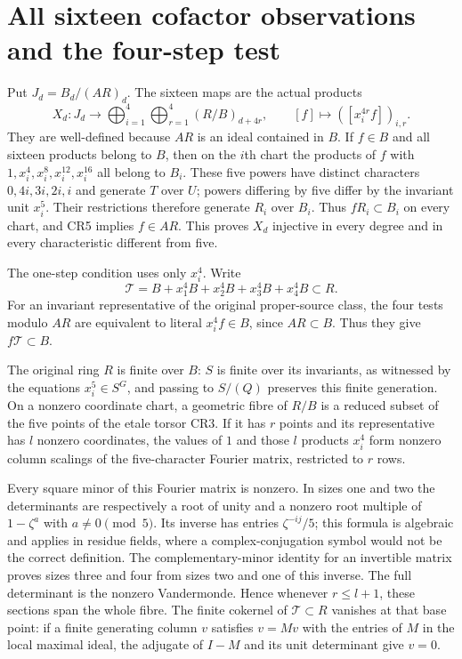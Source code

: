 \section{All sixteen cofactor observations and the four-step test}
Put $J_d=B_d/(AR)_d$.  The sixteen maps are the actual products
\[
 X_d:J_d\longrightarrow\bigoplus_{i=1}^4\bigoplus_{r=1}^4
                          (R/B)_{d+4r},
 \qquad [f]\longmapsto([x_i^{4r}f])_{i,r}.                       \tag{CR6}
\]
They are well-defined because $AR$ is an ideal contained in $B$.
If $f\in B$ and all sixteen products belong to $B$, then on the
$i$th chart the products of $f$ with
$1,x_i^4,x_i^8,x_i^{12},x_i^{16}$ all belong to $B_i$.
These five powers have distinct characters $0,4i,3i,2i,i$ and
generate $T$ over $U$; powers differing by five differ by the
invariant unit $x_i^5$.  Their restrictions therefore generate
$R_i$ over $B_i$.  Thus $fR_i\subset B_i$ on every chart, and
CR5 implies $f\in AR$.  This proves $X_d$ injective in every
degree and in every characteristic different from five.

The one-step condition uses only $x_i^4$.  Write
\[
 \mathcal T=B+x_1^4B+x_2^4B+x_3^4B+x_4^4B\subset R.            \tag{CR7}
\]
For an invariant representative of the original proper-source
class, the four tests modulo $AR$ are equivalent to literal
$x_i^4f\in B$, since $AR\subset B$.  Thus they give
$f\mathcal T\subset B$.

The original ring $R$ is finite over $B$: $S$ is finite over its
invariants, as witnessed by the equations $x_i^5\in S^G$, and
passing to $S/(Q)$ preserves this finite generation.  On a nonzero
coordinate chart, a geometric fibre of $R/B$ is a reduced subset
of the five points of the etale torsor CR3.  If it has $r$ points
and its representative has $l$ nonzero coordinates, the values of
$1$ and those $l$ products $x_i^4$ form nonzero column scalings
of the five-character Fourier matrix, restricted to $r$ rows.

Every square minor of this Fourier matrix is nonzero.  In sizes
one and two the determinants are respectively a root of unity
and a nonzero root multiple of $1-\zeta^a$ with $a\ne0\pmod5$.
Its inverse has entries $\zeta^{-ij}/5$; this formula is algebraic
and applies in residue fields, where a complex-conjugation symbol
would not be the correct definition.  The complementary-minor
identity for an invertible matrix proves sizes three and four
from sizes two and one of this inverse.  The full determinant
is the nonzero Vandermonde.  Hence whenever $r\le l+1$, these
sections span the whole fibre.  The finite cokernel of
$\mathcal T\subset R$ vanishes at that base point: if a finite
generating column $v$ satisfies $v=Mv$ with the entries of $M$
in the local maximal ideal, the adjugate of $I-M$ and its unit
determinant give $v=0$.

